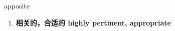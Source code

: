 
\begin{frame}
{\huge apposite}
\begin{center}
\begin{enumerate}\Large
  \item \textbf{相关的，合适的 highly pertinent, appropriate}
\end{enumerate}
\end{center}
\end{frame}
